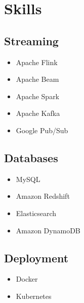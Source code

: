 \documentclass[letterpaper]{resume}
\begin{document}
\begin{minipage}[t]{0.27\textwidth} %


\section{Skills}

\subsection{Streaming}
\begin{itemize}
\item Apache Flink
\item Apache Beam
\item Apache Spark
\end{itemize}

\begin{itemize}
\item Apache Kafka
\item Google Pub/Sub
\end{itemize}

\sectionspace %


\subsection{Databases}
\begin{itemize}
\item MySQL
\item Amazon Redshift
\end{itemize}

\begin{itemize}
\item Elasticsearch
\item Amazon DynamoDB
\end{itemize}

\sectionspace %


\subsection{Deployment}
\begin{itemize}
\item Docker
\item Kubernetes
\end{itemize}


\end{minipage}
\end{document}
